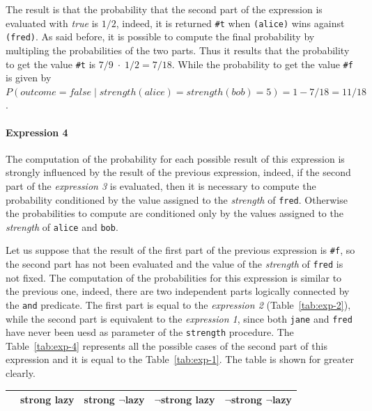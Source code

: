 \begin{itemize}
        The result is that the probability that the second part of the expression is evaluated with \textit{true} is $1/2$, indeed,
        it is returned \texttt{\#t} when \texttt{\textquotesingle (alice)} wins against \texttt{\textquotesingle (fred)}. 
        As said before, it is possible to compute the final probability by multipling the probabilities of the two parts. 
        Thus it results that the probability to get the value \texttt{\#t} is
        $7/9\;\cdot\;1/2 = 7/18$. While the probability to get the value \texttt{\#f} is given by 
        $P(outcome = false\;|\;strength(alice) = strength(bob) = 5) = 1 - 7/18 = 11/18$.
        
        \paragraph*{Expression 4} The computation of the probability for each possible result of this expression is strongly 
        influenced by the result of the previous expression, indeed, if the second part of the \textit{expression 3} is evaluated,
        then it is necessary to compute the probability conditioned by the value assigned to the \textit{strength} of \texttt{\textquotesingle fred}.
        Otherwise the probabilities to compute are conditioned only by the values assigned to the \textit{strength} of \texttt{\textquotesingle alice}
        and \texttt{\textquotesingle bob}.

        Let us suppose that the result of the first part of the previous expression is \texttt{\#f}, so the second part has not been
        evaluated and the value of the \textit{strength} of \texttt{\textquotesingle fred} is not fixed.
        The computation of the probabilities for this expression is similar to the previous one, indeed, there are two independent
        parts logically connected by the \texttt{and} predicate. The first part is equal to the \textit{expression 2} 
        (Table~\ref{tab:exp-2}), while the second part is equivalent to the \textit{expression 1}, since both \texttt{\textquotesingle jane} and
        \texttt{\textquotesingle fred} have never been uesd as parameter of the \texttt{strength} procedure.
        The Table~\ref{tab:exp-4} represents all the possible cases of the second part of this expression and it is equal to
        the Table~\ref{tab:exp-1}. The table is shown for greater clearly. 
        \begin{table}[H]
            \centering
            \bgroup
                \def\arraystretch{1.5}
                \begin{tabular}{| l | C{1.8cm} C{1.8cm} C{1.8cm} C{1.8cm}  |}                    
                    \hline
                     & 
                        \textbf{strong lazy} & \textbf{strong $\neg$lazy} & \textbf{$\neg$strong lazy} & \textbf{$\neg$strong $\neg$lazy} \\
                    \hline


\end{tabular}
\end{table}
\end{itemize}

